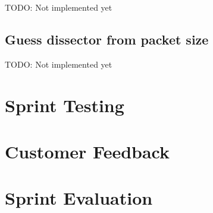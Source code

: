 TODO: Not implemented yet

\subsection{Guess dissector from packet size}
TODO: Not implemented yet

\section{Sprint Testing}


\section{Customer Feedback}


\section{Sprint Evaluation}


